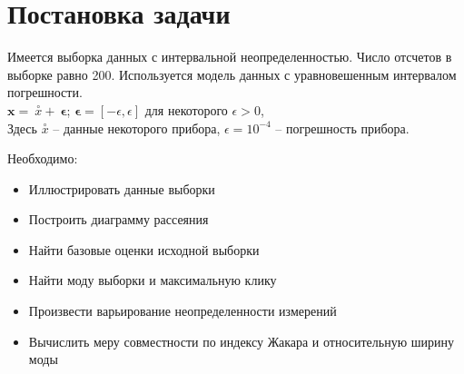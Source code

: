 \section{Постановка задачи}

Имеется выборка данных с интервальной неопределенностью. Число отсчетов в выборке равно 200. Используется модель данных с  уравновешенным интервалом погрешности. \\

$\boldsymbol{\bm{x}} = \ \stackrel{\circ}{x} + \ \boldsymbol{\bm{\epsilon}}$; \quad $\boldsymbol{\bm{\epsilon}} = [-\epsilon, \epsilon]$  для некоторого $\epsilon >0 $, \\

Здесь $\stackrel{\circ}{x}$ -- данные некоторого прибора, $\epsilon = 10 ^ {-4}$ -- погрешность прибора. \par

Необходимо:
\begin{itemize}
	\item Иллюстрировать данные выборки
	\item Построить диаграмму рассеяния
	\item Найти базовые оценки исходной выборки
	\item Найти моду выборки и максимальную клику
	\item Произвести варьирование неопределенности измерений
	\item Вычислить меру совместности по индексу Жакара и относительную ширину моды
\end{itemize}

\newpage
